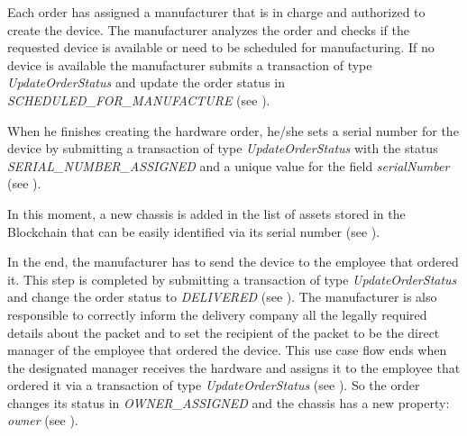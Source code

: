 
Each order has assigned a manufacturer that is in charge and authorized to create the device.
The manufacturer analyzes the order and checks if the requested device is available or need to be scheduled for manufacturing. If no device is available the manufacturer submits a transaction of type \emph{UpdateOrderStatus} and update the order status in \emph{SCHEDULED_FOR_MANUFACTURE} (see ). 


When he finishes creating the hardware order, he/she sets a serial number for the device by submitting a transaction of type \emph{UpdateOrderStatus} with the status \emph{SERIAL_NUMBER_ASSIGNED} and a unique value for the field \emph{serialNumber} (see ).


In this moment, a new chassis is added in the list of assets stored in the Blockchain that can be easily identified via its serial number (see ).


In the end, the manufacturer has to send the device to the employee that ordered it. This step is completed by submitting a transaction of type \emph{UpdateOrderStatus} and change the order status to \emph{DELIVERED} (see ). The manufacturer is also responsible to correctly inform the delivery company all the legally required details about the packet and to set the recipient of the packet to be the direct manager of the employee that ordered the device. 
This use case flow ends when the designated manager receives the hardware and assigns it to the employee that ordered it via a transaction of type \emph{UpdateOrderStatus} (see ). So the order changes its status in \emph{OWNER_ASSIGNED} and the chassis has a new property: \emph{owner} (see ).

